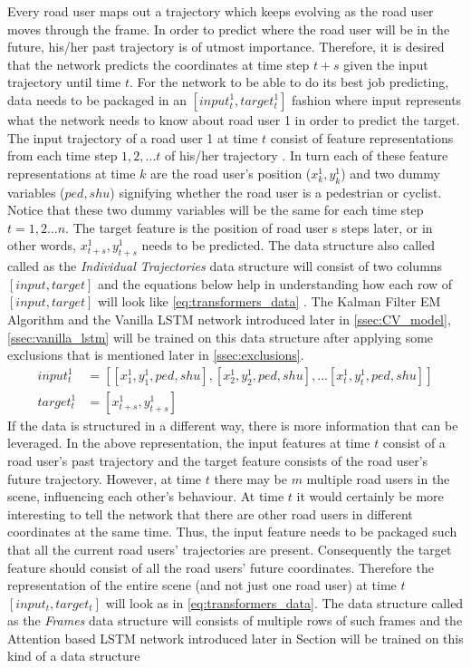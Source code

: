 \documentclass{article}
\begin{document}
Every road user maps out a trajectory which keeps evolving as the road user moves through the frame. In order to predict where the road user will be in the future, his/her past trajectory is of utmost importance. Therefore, it is desired that the network predicts the coordinates at time step $t+s$ given the input trajectory until time $t$. For the network to be able to do its best job predicting, data needs to be packaged in an $[input^{1}_t,target^{1}_t]$ fashion where input represents what the network needs to know about road user 1 in order to predict the target. The input trajectory of a road user 1 at time $t$ consist of feature representations from each time step $1,2,...t$  of his/her trajectory . In turn each of these feature representations at time $k$ are the road user's position ($x^1_k,y^1_k$) and two dummy variables ($ped,shu$) signifying whether the road user is a pedestrian or cyclist. Notice that these two dummy variables will be the same for each time step $t=1,2...n$. The target feature is the position of road user s steps later, or in other words, $x^{1}_{t+s},y^{1}_{t+s}$  needs to be predicted. The data structure also called called as the \textit{Individual Trajectories} data structure will consist of two columns $[input,target]$ and the equations below help in understanding how each row of $[input,target]$ will look like \ref{eq:transformers_data} . The Kalman Filter EM Algorithm and the Vanilla LSTM network introduced later in \ref{ssec:CV_model}, \ref{ssec:vanilla_lstm} will be trained on this data structure after applying some exclusions that is mentioned later in \ref{ssec:exclusions}. 
\begin{equation}\label{eq:lstm_data}
    \begin{split}
        input^{1}_t&=[[x^{1}_1,y^{1}_1,ped,shu],[x^{1}_2,y^{1}_2,ped,shu],...[x^{1}_t,y^{1}_t,ped,shu]]\\
        target^{1}_t&=[x^{1}_{t+s},y^{1}_{t+s}]
    \end{split}
\end{equation}
If the data is structured in a different way, there is more information that can be leveraged. In the above representation, the input features at time $t$ consist of a road user's past trajectory and the target feature consists of the road user's future trajectory. However, at  time $t$ there may be $m$ multiple road users in the scene, influencing each other's behaviour. At time $t$ it would certainly be more interesting to tell the network that there are other road users in different coordinates at the same time. Thus, the input feature needs to be packaged such that all the current road users' trajectories are present. Consequently the target feature should consist of all the road users' future coordinates. Therefore the representation of the entire scene (and not just one road user) at time $t$ $[input_t,target_t]$ will look as in \ref{eq:transformers_data}. The data structure called as the \textit{Frames} data structure will consists of multiple rows of such frames and the Attention based LSTM network introduced later in Section will be trained on this kind of a data structure
\end{document}
